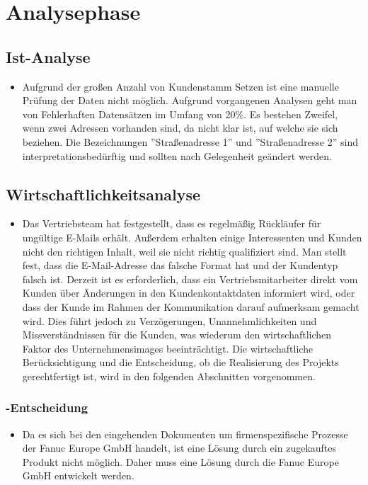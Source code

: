 \section{Analysephase} 
\label{sec:Analysephase}


\subsection{Ist-Analyse} 
\label{sec:IstAnalyse}
\begin{itemize}
	\item Aufgrund der gro{\ss}en Anzahl von Kundenstamm Setzen ist eine manuelle Pr\"ufung der Daten nicht
	m\"oglich. Aufgrund vorgangenen Analysen geht man von Fehlerhaften Datens\"atzen im Umfang von 20\%. 
	Es bestehen Zweifel, wenn zwei Adressen vorhanden sind, da nicht klar ist, auf welche sie sich beziehen. 
	Die Bezeichnungen ''Stra{\ss}enadresse 1'' und ''Stra{\ss}enadresse 2'' sind interpretationsbed\"urftig und sollten nach Gelegenheit ge\"andert werden. 
	
\end{itemize}


\subsection{Wirtschaftlichkeitsanalyse}
\label{sec:Wirtschaftlichkeitsanalyse}
\begin{itemize}
	\item Das Vertriebsteam hat festgestellt, dass es regelm\"a{\ss}ig R\"uckl\"aufer f\"ur ung\"ultige E-Mails erh\"alt. 
	Au{\ss}erdem erhalten einige Interessenten und Kunden nicht den richtigen Inhalt, weil sie nicht richtig qualifiziert sind. 
	Man stellt fest, dass die E-Mail-Adresse das falsche Format hat und der Kundentyp falsch ist.
	Derzeit ist es erforderlich, dass ein Vertriebsmitarbeiter direkt vom Kunden \"uber \"Anderungen in den Kundenkontaktdaten informiert wird, oder dass der Kunde im Rahmen der Kommunikation darauf aufmerksam gemacht wird.
	Dies f\"uhrt jedoch zu Verz\"ogerungen, Unannehmlichkeiten und Missverst\"andnissen f\"ur die Kunden, was wiederum den wirtschaftlichen Faktor des Unternehmensimages beeintr\"achtigt.
	Die wirtschaftliche Ber\"ucksichtigung und die Entscheidung, ob die Realisierung des Projekts gerechtfertigt ist, wird in den folgenden Abschnitten vorgenommen.
\end{itemize}


\subsubsection{-Entscheidung}
\label{sec:MakeOrBuyEntscheidung}
\begin{itemize}
	\item Da es sich bei den eingehenden Dokumenten um firmenspezifische Prozesse der Fanuc Europe GmbH handelt, ist eine L\"osung durch ein zugekauftes Produkt nicht m\"oglich. 
	Daher muss eine L\"osung durch die Fanuc Europe GmbH entwickelt werden.
\end{itemize}


